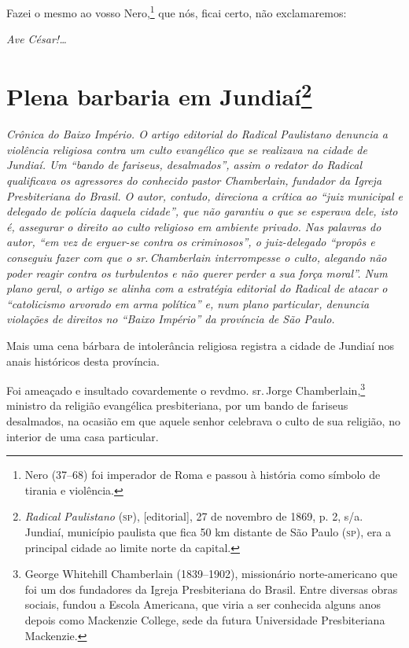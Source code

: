 Fazei o mesmo ao vosso Nero,\footnote{Nero (37--68) foi imperador de
  Roma e passou à história como símbolo de tirania e violência.} que
nós, ficai certo, não exclamaremos:

\emph{Ave César!\ldots{}}

\chapter{Plena barbaria em Jundiaí\footnote{\emph{Radical Paulistano}
  (\textsc{sp}), {[}editorial{]}, 27 de novembro de 1869, p. 2, s/a. Jundiaí, município
  paulista que fica 50 km distante de São Paulo (\textsc{sp}), era a principal
  cidade ao limite norte da capital.}}

\begin{didascalia}\itshape
Crônica do Baixo Império. O artigo editorial do \textnormal{Radical Paulistano}
denuncia a violência religiosa contra um culto evangélico que se
realizava na cidade de Jundiaí. Um ``bando de fariseus, desalmados'',
assim o redator do \textnormal{Radical} qualificava os agressores do conhecido
pastor Chamberlain, fundador da Igreja Presbiteriana do Brasil. O autor,
contudo, direciona a crítica ao ``juiz municipal e delegado de polícia
daquela cidade'', que não garantiu o que se esperava dele, isto é,
assegurar o direito ao culto religioso em ambiente privado. Nas palavras
do autor, ``em vez de erguer-se contra os criminosos'', o juiz-delegado
``propôs e conseguiu fazer com que o sr.\,Chamberlain interrompesse o
culto, alegando não poder reagir contra os turbulentos e não querer
perder a sua força moral''. Num plano geral, o artigo se alinha com a
estratégia editorial do \textnormal{Radical} de atacar o ``catolicismo arvorado
em arma política'' e, num plano particular, denuncia violações de
direitos no ``Baixo Império'' da província de São Paulo.
\end{didascalia}



Mais uma cena bárbara de intolerância religiosa registra a cidade de
Jundiaí nos anais históricos desta província.

Foi ameaçado e insultado covardemente o revdmo. sr.\,Jorge
Chamberlain,\footnote{George Whitehill Chamberlain (1839--1902),
  missionário norte-americano que foi um dos fundadores da Igreja
  Presbiteriana do Brasil. Entre diversas obras sociais, fundou a Escola
  Americana, que viria a ser conhecida alguns anos depois como Mackenzie
  College, sede da futura Universidade Presbiteriana Mackenzie.}
ministro da religião evangélica presbiteriana, por um bando de fariseus
desalmados, na ocasião em que aquele senhor celebrava o culto de sua
religião, no interior de uma casa particular.

